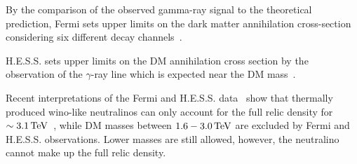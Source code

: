 By the comparison of the observed gamma-ray signal to the theoretical prediction, Fermi sets upper limits on the dark matter annihilation cross-section considering six different decay channels~\cite{bib:Fermi_DM}.

H.E.S.S. sets upper limits on the DM annihilation cross section by the observation of the $\gamma$-ray line which is expected near the DM mass~\cite{bib:HESS_DM}.

Recent interpretations of the Fermi and H.E.S.S. data~\cite{bib:IndirectSearches_Fan_2013,bib:IndirectSearches_Cohen_2013,bib:IndirectSearches_Hryczuk_2014,bib:IndirectSearches_Beneke_2015} show that thermally produced wino-like neutralinos can only account for the full relic density for $\sim3.1\,\text{Te}\kern-0.06667em\text{V}$~\cite{bib:IndirectSearches_Cohen_2013}, while DM masses between $1.6-3.0\,\text{Te}\kern-0.06667em\text{V}$ are excluded by Fermi and H.E.S.S. observations.
Lower masses are still allowed, however, the neutralino cannot make up the full relic density.


